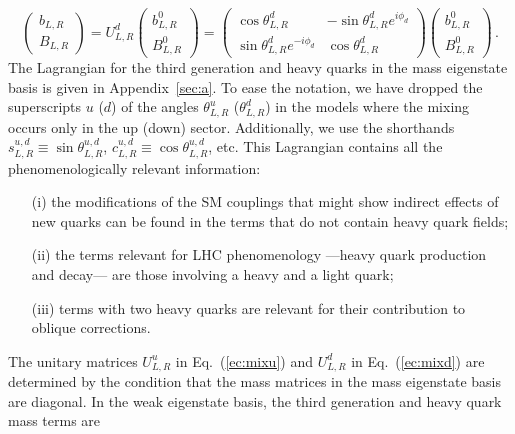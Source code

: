 \documentclass[12pt,a4paper]{article}
\begin{document}
\begin{equation}
\left(\! \begin{array}{c} b_{L,R} \\ B_{L,R} \end{array} \!\right)
= U_{L,R}^d \left(\! \begin{array}{c} b^0_{L,R} \\ B^0_{L,R} \end{array} \!\right)
= \left(\! \begin{array}{cc} \cos \theta_{L,R}^d & -\sin \theta_{L,R}^d e^{i \phi_d} \\ \sin \theta_{L,R}^d e^{-i \phi_d} & \cos \theta_{L,R}^d \end{array}
\!\right)
\left(\! \begin{array}{c} b^0_{L,R} \\ B^0_{L,R} \end{array} \!\right) \,.
\label{ec:mixd}
\end{equation}
The Lagrangian for the third generation and heavy quarks in the mass eigenstate basis is given in Appendix~\ref{sec:a}. To ease the notation, we have dropped the superscripts $u$ ($d$) of the angles $\theta^u_{L,R}$ ($\theta^d_{L,R}$) in the models where the mixing occurs only in the up (down) sector. Additionally, we use the shorthands $s_{L,R}^{u,d} \equiv \sin \theta_{L,R}^{u,d}$, $c_{L,R}^{u,d} \equiv \cos \theta_{L,R}^{u,d}$, etc.
This Lagrangian contains all the phenomenologically relevant information:
\begin{itemize}
\item[(i)] the modifications of the SM couplings that might show indirect effects of new quarks can be found in the terms that do not contain heavy quark fields;
\item[(ii)] the terms relevant for LHC phenomenology ---heavy quark production and decay--- are those involving a heavy and a light quark;
\item[(iii)] terms with two heavy quarks are relevant for their contribution to oblique corrections.
\end{itemize}
The unitary matrices $U_{L,R}^u$ in Eq.~(\ref{ec:mixu}) and $U_{L,R}^d$ in Eq.~(\ref{ec:mixd}) are determined by the condition that the mass matrices in the mass eigenstate basis are diagonal. In the weak eigenstate basis, the third generation and heavy quark mass terms are
\end{document}
